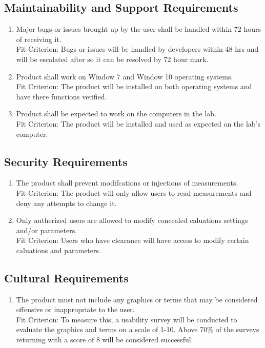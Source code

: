 \documentclass[12pt, titlepage]{article}
\begin{document}
\subsection{Maintainability and Support Requirements}
\begin{adjustwidth}{2.2em}{0pt}
\begin{enumerate}[{NFR-M}1.] 
  \item Major bugs or issues brought up by the user shall be handled within 72 hours of receiving it.\\
  Fit Criterion: Bugs or issues will be handled by developers within 48 hrs and will be escalated after so it can be resolved by 72 hour mark.
  \item Product shall work on Window 7 and Window 10 operating systems.\\
  Fit Criterion: The product will be installed on both operating systems and have there functions verified.
  \item Product shall be expected to work on the computers in the lab.\\
  Fit Criterion: The product will be installed and used as expected on the lab's computer.
\end{enumerate} 
\end{adjustwidth}

\subsection{Security Requirements}
\begin{adjustwidth}{2.0em}{0pt}
\begin{enumerate}[{NFR-S}1.]
  \item The product shall prevent modifcations or injections of measurements.\\
  Fit Criterion: The product will only allow users to read measurements and deny any attempts to change it.
  \item Only autherized users are allowed to modify concealed caluations settings and/or parameters.\\
  Fit Criterion: Users who have clearance will have access to modify certain caluations and parameters.
\end{enumerate}
\end{adjustwidth}

\subsection{Cultural Requirements}
\begin{adjustwidth}{2.2em}{0pt}
\begin{enumerate}[{NFR-C}1.]
    \item The product must not include any graphics or terms that may be considered offensive or inappropriate to the user.\\
    Fit Criterion: To measure this, a usability survey will be conducted to evaluate the graphics and terms on a scale of 1-10. Above 70\% of the surveys returning with a score of 8 will be considered successful.
\end{enumerate}
\end{adjustwidth}
\end{document}
